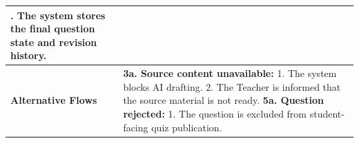 \begin{longtable}{|>{\raggedright\arraybackslash}p{}|>{\raggedright\arraybackslash}p{}|}
6. The system stores the final question state and revision history. \\ \hline
\textbf{Alternative Flows} &
\textbf{3a. Source content unavailable:} \newline
\hspace*{1em}1. The system blocks AI drafting. \newline
\hspace*{1em}2. The Teacher is informed that the source material is not ready. \newline
\textbf{5a. Question rejected:} \newline
\hspace*{1em}1. The question is excluded from student-facing quiz publication. \\
\end{longtable}

